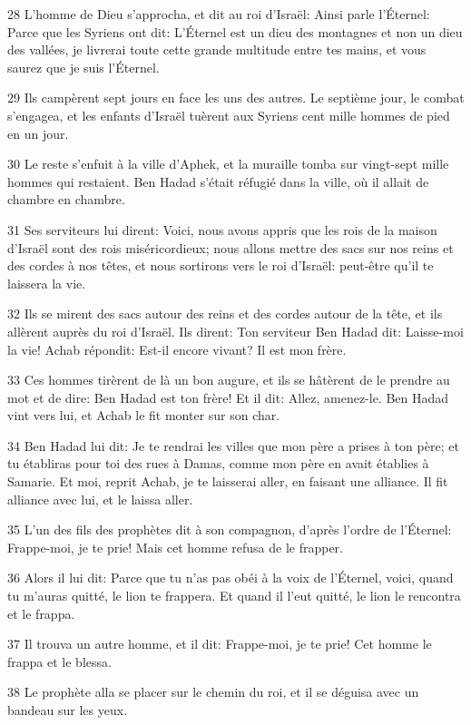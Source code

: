 \par 28 L'homme de Dieu s'approcha, et dit au roi d'Israël: Ainsi parle l'Éternel: Parce que les Syriens ont dit: L'Éternel est un dieu des montagnes et non un dieu des vallées, je livrerai toute cette grande multitude entre tes mains, et vous saurez que je suis l'Éternel.
\par 29 Ils campèrent sept jours en face les uns des autres. Le septième jour, le combat s'engagea, et les enfants d'Israël tuèrent aux Syriens cent mille hommes de pied en un jour.
\par 30 Le reste s'enfuit à la ville d'Aphek, et la muraille tomba sur vingt-sept mille hommes qui restaient. Ben Hadad s'était réfugié dans la ville, où il allait de chambre en chambre.
\par 31 Ses serviteurs lui dirent: Voici, nous avons appris que les rois de la maison d'Israël sont des rois miséricordieux; nous allons mettre des sacs sur nos reins et des cordes à nos têtes, et nous sortirons vers le roi d'Israël: peut-être qu'il te laissera la vie.
\par 32 Ils se mirent des sacs autour des reins et des cordes autour de la tête, et ils allèrent auprès du roi d'Israël. Ils dirent: Ton serviteur Ben Hadad dit: Laisse-moi la vie! Achab répondit: Est-il encore vivant? Il est mon frère.
\par 33 Ces hommes tirèrent de là un bon augure, et ils se hâtèrent de le prendre au mot et de dire: Ben Hadad est ton frère! Et il dit: Allez, amenez-le. Ben Hadad vint vers lui, et Achab le fit monter sur son char.
\par 34 Ben Hadad lui dit: Je te rendrai les villes que mon père a prises à ton père; et tu établiras pour toi des rues à Damas, comme mon père en avait établies à Samarie. Et moi, reprit Achab, je te laisserai aller, en faisant une alliance. Il fit alliance avec lui, et le laissa aller.
\par 35 L'un des fils des prophètes dit à son compagnon, d'après l'ordre de l'Éternel: Frappe-moi, je te prie! Mais cet homme refusa de le frapper.
\par 36 Alors il lui dit: Parce que tu n'as pas obéi à la voix de l'Éternel, voici, quand tu m'auras quitté, le lion te frappera. Et quand il l'eut quitté, le lion le rencontra et le frappa.
\par 37 Il trouva un autre homme, et il dit: Frappe-moi, je te prie! Cet homme le frappa et le blessa.
\par 38 Le prophète alla se placer sur le chemin du roi, et il se déguisa avec un bandeau sur les yeux.
